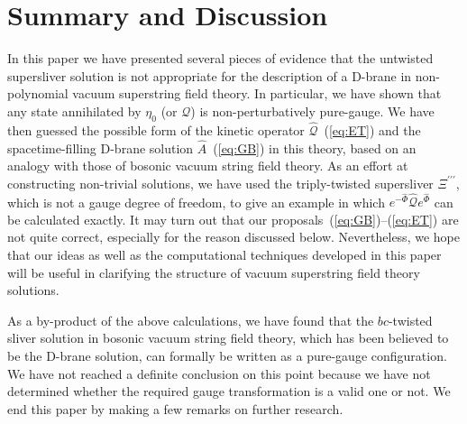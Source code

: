 \documentclass[a4paper,12pt]{article}
\newcommand{\cQ}{\mathcal{Q}}
\newcommand{\tp}{\prime\prime\prime}
\newcommand{\sectiono}[1]{\section{#1}\setcounter{equation}{0}}
\begin{document}
\sectiono{Summary and Discussion}\label{sec:sum}
In this paper we have presented several pieces of evidence that the untwisted supersliver solution 
is not appropriate for the description of a D-brane in non-polynomial vacuum superstring field theory. 
In particular, we have shown that any state 
annihilated by $\eta_0$ (or $\cQ$) is non-perturbatively pure-gauge. 
We have then guessed the possible form of the kinetic operator $\widehat{\cQ}$~(\ref{eq:ET}) and 
the spacetime-filling D-brane solution $\widehat{A}$~(\ref{eq:GB}) in this theory, 
based on an analogy with those of bosonic vacuum string field theory. 
As an effort at constructing non-trivial solutions, 
we have used the triply-twisted supersliver $\Xi^{\tp}$, which is not a gauge degree of freedom, 
to give an example in which $e^{-\widehat{\Phi}} 
\widehat{\cQ}e^{\widehat{\Phi}}$ can be calculated exactly. 
It may turn out that our proposals~(\ref{eq:GB})--(\ref{eq:ET}) are not quite correct, especially 
for the reason discussed below. Nevertheless, we hope that our ideas 
as well as the computational techniques developed in this paper 
will be useful in clarifying the structure of vacuum superstring field theory solutions. 

As a by-product of the above calculations, we have found that the $bc$-twisted sliver solution 
in bosonic vacuum string field theory, which has been 
believed to be the D-brane solution, 
can formally be written as a pure-gauge configuration. 
We have not reached a definite conclusion on this point because we have not determined whether 
the required gauge transformation is a valid one or not. 
We end this paper by making a few remarks on further research. 
\medskip
\end{document}

